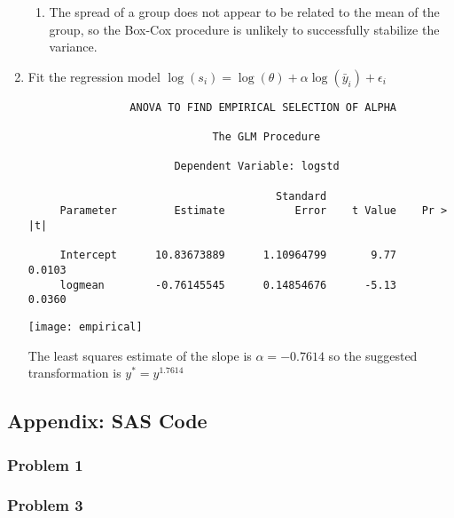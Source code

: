 \documentclass[11pt]{article}
\begin{document}
\begin{enumerate}
\begin{enumerate}
\item %

The spread of a group does not appear to be related to the mean of the
group, so the Box-Cox procedure is unlikely to successfully stabilize
the variance.

\end{enumerate}

\pagebreak
\item %
Fit the regression model \(\log(s_i)=\log(\theta)+\alpha\log(\bar{y}_i)+\epsilon_i\)

\begin{verbatim}
                ANOVA TO FIND EMPIRICAL SELECTION OF ALPHA

                             The GLM Procedure
 
                       Dependent Variable: logstd   

                                       Standard
     Parameter         Estimate           Error    t Value    Pr > |t|

     Intercept      10.83673889      1.10964799       9.77      0.0103
     logmean        -0.76145545      0.14854676      -5.13      0.0360
\end{verbatim}

\begin{center}\texttt{[image: empirical]}\end{center}

The least squares estimate of the slope is \(\widehat{\alpha}=-0.7614\) so the
suggested transformation is \(y^*=y^{1.7614}\)

\end{enumerate}

\pagebreak
\subsection*{Appendix: SAS Code}

\subsubsection*{Problem 1}



\subsubsection*{Problem 3}


\end{document}
